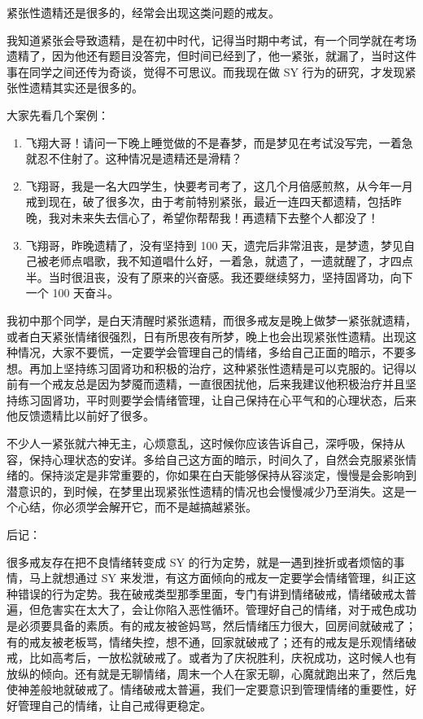 \documentclass{ctexart}
\begin{document}
紧张性遗精还是很多的，经常会出现这类问题的戒友。

我知道紧张会导致遗精，是在初中时代，记得当时期中考试，有一个同学就在考场遗精了，因为他还有题目没答完，但时间已经到了，他一紧张，就漏了，当时这件事在同学之间还传为奇谈，觉得不可思议。而我现在做 SY 行为的研究，才发现紧张性遗精其实还是很多的。

大家先看几个案例：

\begin{enumerate}
    \item 飞翔大哥！请问一下晚上睡觉做的不是春梦，而是梦见在考试没写完，一着急就忍不住射了。这种情况是遗精还是滑精？
    \item 飞翔哥，我是一名大四学生，快要考司考了，这几个月倍感煎熬，从今年一月戒到现在，破了很多次，由于考前特别紧张，最近一连四天都遗精，包括昨晚，我对未来失去信心了，希望你帮帮我！再遗精下去整个人都没了！
    \item 飞翔哥，昨晚遗精了，没有坚持到 100 天，遗完后非常沮丧，是梦遗，梦见自己被老师点唱歌，我不知道唱什么好，一着急，就遗了，一遗就醒了，才四点半。当时很沮丧，没有了原来的兴奋感。我还要继续努力，坚持固肾功，向下一个 100 天奋斗。
\end{enumerate}

我初中那个同学，是白天清醒时紧张遗精，而很多戒友是晚上做梦一紧张就遗精，或者白天紧张情绪很强烈，日有所思夜有所梦，晚上也会出现紧张性遗精。出现这种情况，大家不要慌，一定要学会管理自己的情绪，多给自己正面的暗示，不要多想。再加上坚持练习固肾功和积极的治疗，这种紧张性遗精是可以克服的。记得以前有一个戒友总是因为梦魇而遗精，一直很困扰他，后来我建议他积极治疗并且坚持练习固肾功，平时则要学会情绪管理，让自己保持在心平气和的心理状态，后来他反馈遗精比以前好了很多。

不少人一紧张就六神无主，心烦意乱，这时候你应该告诉自己，深呼吸，保持从容，保持心理状态的安详。多给自己这方面的暗示，时间久了，自然会克服紧张情绪的。保持淡定是非常重要的，你如果在白天能够保持从容淡定，慢慢是会影响到潜意识的，到时候，在梦里出现紧张性遗精的情况也会慢慢减少乃至消失。这是一个心结，你必须学会解开它，而不是越搞越紧张。

后记：

很多戒友存在把不良情绪转变成 SY 的行为定势，就是一遇到挫折或者烦恼的事情，马上就想通过 SY 来发泄，有这方面倾向的戒友一定要学会情绪管理，纠正这种错误的行为定势。我在破戒类型那季里面，专门有讲到情绪破戒，情绪破戒太普遍，但危害实在太大了，会让你陷入恶性循环。管理好自己的情绪，对于戒色成功是必须要具备的素质。有的戒友被爸妈骂，然后情绪压力很大，回房间就破戒了；有的戒友被老板骂，情绪失控，想不通，回家就破戒了；还有的戒友是乐观情绪破戒，比如高考后，一放松就破戒了。或者为了庆祝胜利，庆祝成功，这时候人也有放纵的倾向。还有就是无聊情绪，周末一个人在家无聊，心魔就跑出来了，然后鬼使神差般地就破戒了。情绪破戒太普遍，我们一定要意识到管理情绪的重要性，好好管理自己的情绪，让自己戒得更稳定。
\end{document}
